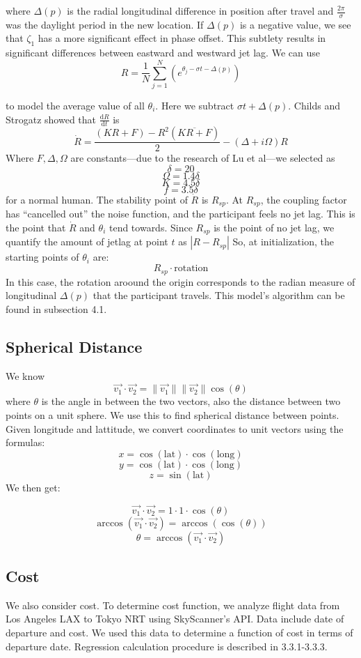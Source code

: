 where $\Delta(p)$ is the radial longitudinal difference in position after travel and $\frac{2\pi}{\sigma}$ was the daylight period in the new location. 
If $\Delta(p)$ is a negative value, we see that $\zeta_1$ has a more significant effect in phase offset. This subtlety results in significant differences between eastward and westward jet lag. 
We can use
$$R = \frac{1}{N} \sum_{j=1}^N (e^{\theta_j - \sigma t - \Delta(p)})$$

to model the average value of all $\theta_i$. Here we subtract $\sigma t+ \Delta(p)$. Childs and Strogatz showed that $\frac{\mathrm{d} R}{\mathrm{d} t}$ is 
$$\dot{R} = \frac{(KR + F) - R^2(\overline{KR + F})}{2} - (\Delta + i\Omega)R$$
Where $F, \Delta, \Omega$ are constants---due to the research of Lu et al---we selected as 
$$\delta = 20$$
$$\Omega = 1.4 \delta$$
$$K = 4.5 \delta$$
$$f = 3.5 \delta$$
for a normal human.
The stability point of $\dot{R}$ is $R_{sp}$.
At $R_{sp}$, the coupling factor has ``cancelled out'' the noise function, and the participant feels no jet lag. This is the point that $\dot{R}$ and $\theta_i$ tend towards.
Since $R_{sp}$ is the point of no jet lag, we quantify the amount of jetlag at point $t$ as $|R - R_{sp}|$
So, at initialization, the starting points of $\theta_i$ are:
$$R_{sp} \cdot \mathrm{rotation}$$
In this case, the rotation aroound the origin corresponds to the radian measure of longitudinal $\Delta(p)$ that the participant travels. 
This model's algorithm can be found in subsection 4.1.
\subsection{Spherical Distance}
We know
$$\vec{v_1} \cdot \vec{v_2} = \|\vec{v_1}\| \|\vec{v_2}\| \cos(\theta)$$
where $\theta$ is the angle in between the two vectors, also the distance between two points on a unit sphere. We use this to find spherical distance between points. Given longitude and lattitude, we convert coordinates to unit vectors using the formulas:
$$x = \cos(\mathrm{lat}) \cdot \cos(\mathrm{long})$$
$$y = \cos(\mathrm{lat}) \cdot \cos(\mathrm{long})$$
$$z = \sin(\mathrm{lat})$$
We then get:

$$\vec{v_1} \cdot \vec{v_2} = 1 \cdot 1 \cdot \cos(\theta)$$
$$\arccos({\vec{v_1} \cdot \vec{v_2}}) = \arccos(\cos(\theta))$$
$$\theta = \arccos(\vec{v_1} \cdot \vec{v_2})$$

\subsection{Cost}
We also consider cost. To determine cost function, we analyze flight data from Los Angeles LAX to Tokyo NRT using SkyScanner's API. Data include date of departure and cost. We used this data to determine a function of cost in terms of departure date. Regression calculation procedure is described in 3.3.1-3.3.3.




